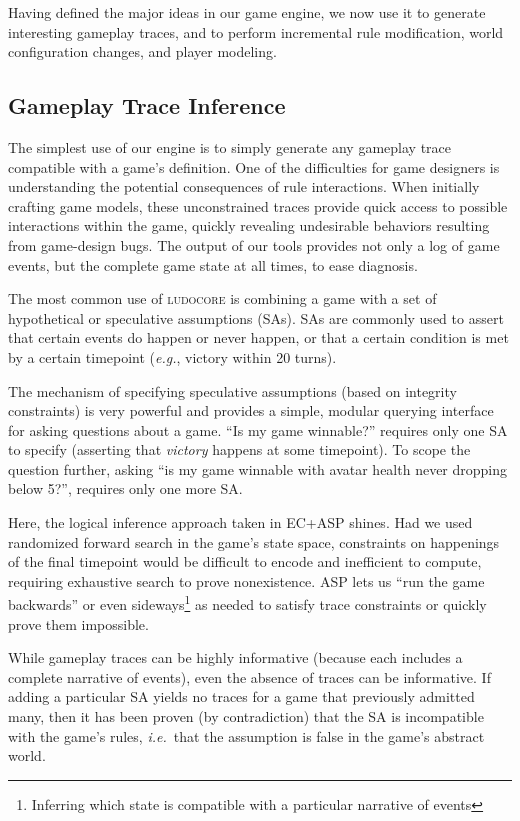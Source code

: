 \documentclass[letterpaper]{article}
\newcommand{\ludocore}{\textsc{ludocore}}
\begin{document}
Having defined the major ideas in our game engine, we now use it to
generate interesting gameplay traces, and to perform incremental rule
modification, world configuration changes, and player modeling.

\subsection{Gameplay Trace Inference}

The simplest use of our engine is to simply generate any gameplay trace
compatible with a game's definition. One of the difficulties for game designers
is understanding the potential consequences of rule interactions. When
initially crafting game models, these unconstrained traces provide quick access
to possible interactions within the game, quickly revealing undesirable
behaviors resulting from game-design bugs.  The output of our tools provides
not only a log of game events, but the complete game state at all times, to
ease diagnosis.

The most common use of \ludocore{} is combining a game with a set of
hypothetical or speculative assumptions (SAs). SAs are commonly used to assert
that certain events do happen or never happen, or that a certain condition
is met by a certain timepoint (\emph{e.g.}, victory within 20 turns).

The mechanism of specifying speculative assumptions (based on integrity constraints)
is very powerful and provides a simple, modular querying interface for asking
questions about a game. ``Is my game winnable?'' requires only one SA to
specify (asserting that \emph{victory} happens at some timepoint). To scope the
question further, asking ``is my game winnable with avatar health never
dropping below 5?'', requires only one more SA.

Here, the logical inference approach taken in EC+ASP shines. Had we used
randomized forward search in the game's state space, constraints on happenings
of the final timepoint would be difficult to encode and inefficient to compute,
requiring exhaustive search to prove nonexistence.  ASP lets us ``run the game
backwards'' or even sideways\footnote{Inferring which state is compatible with
a particular narrative of events} as needed to satisfy trace constraints or
quickly prove them impossible.

While gameplay traces can be highly informative (because each includes a
complete narrative of events), even the absence of traces can be informative.
If adding a particular SA yields no traces for a game that previously admitted
many, then it has been proven (by contradiction) that the SA is incompatible
with the game's rules, \emph{i.e.}\ that the assumption is false in the game's abstract
world.
\end{document}
